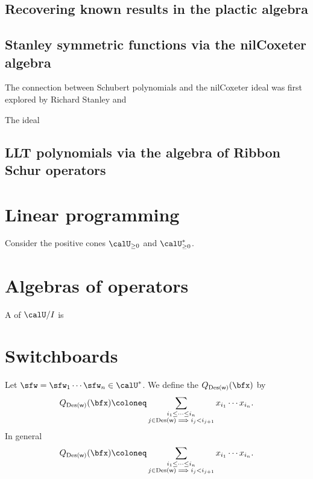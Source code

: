 \documentclass{article}
\newcommand*\Des{\operatorname{Des}}
\begin{document}
\subsection{Recovering known results in the plactic algebra}

\begin{theorem}
\end{theorem}

\subsection{Stanley symmetric functions via the nilCoxeter algebra}

The connection between Schubert polynomials and the nilCoxeter ideal was first explored by Richard Stanley and 

\begin{definition}
    The  ideal
\end{definition}

\subsection{LLT polynomials via the algebra of Ribbon Schur operators}

\section{Linear programming}

Consider the positive cones $\calU_{\geq 0}$ and $\calU^\ast_{\geq 0}$.


\section{Algebras of operators}

\begin{definition}
    A  of $\calU/I$ is
\end{definition}

\section{Switchboards}

\begin{definition}
    Let $\sfw = \sfw_1\cdots\sfw_n \in \calU^\ast$.
    We define the  $Q_{\Des(\sf w)}(\bfx)$ by
    \[
        Q_{\Des(\sf w)}(\bfx)
        \coloneq
        \sum_{
            \substack{
                i_1 \leq \cdots \leq i_n \\
                j \in \Des({\sf w}) \implies i_j < i_{j+1}
            }
        }
        x_{i_1} \cdots x_{i_n}.
    \]
    In general
    \[
        Q_{\Des(\sf w)}(\bfx)
        \coloneq
        \sum_{
            \substack{
                i_1 \leq \cdots \leq i_n \\
                j \in \Des({\sf w}) \implies i_j < i_{j+1}
            }
        }
        x_{i_1} \cdots x_{i_n}.
    \]
\end{definition}
\end{document}
